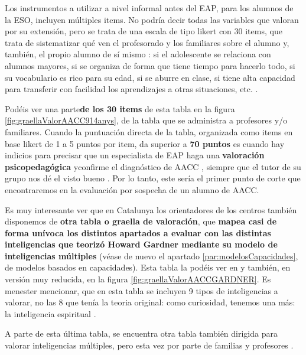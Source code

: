\documentclass[12pt, a4paper]{article}
\begin{document}
	  Los instrumentos a utilizar a nivel informal antes del EAP, para los alumnos de la ESO, incluyen múltiples items. No podría decir todas las variables que valoran por su extensión, pero se trata de una escala de tipo likert con 30 items, que trata de sistematizar qué ven el profesorado y los familiares sobre el alumno y, también, el propio alumno de sí mismo \parencite[21]{gencatAltesCapacitats2013}: si el adolescente se relaciona con alumnos mayores, si se organiza de forma que tiene tiempo para hacerlo todo, si su vocabulario es rico para su edad, si se aburre en clase, si tiene alta capacidad para transferir con facilidad los aprendizajes a otras situaciones, etc. \parencite[19]{gencatAltesCapacitats2013}. 
	  
	  
	  Podéis ver una parte\textbf{de los 30 items} de esta tabla en la figura \ref{fig:graellaValorAACC914anys}, de la tabla que se administra a profesores y/o familiares. Cuando la puntuación directa de la tabla, organizada como items en base likert de 1 a 5 puntos por item, da superior a \textbf{70 puntos} es cuando hay indicios para precisar que un especialista de EAP haga una \textbf{valoración psicopedagógica} yconfirme el diagnóstico de AACC \parencite[29]{gencatAltesCapacitats2013}, siempre que el tutor de su grupo nos dé el visto bueno \parencite[p.37, punto 1]{gencatAltesCapacitats2013}.  Por lo tanto, este sería el primer punto de corte que encontraremos en la evaluación por sospecha de un alumno de AACC.
	  
	  Es muy interesante ver que en Catalunya los orientadores de los centros también disponemos de\textbf{ otra tabla o graella de valoración}, que \textbf{mapea casi de forma unívoca los distintos apartados a evaluar con las distintas inteligencias que teorizó Howard Gardner mediante su modelo de inteligencias múltiples}  (véase de nuevo el apartado  \ref{par:modelosCapacidades}, de modelos basados en capacidades). Esta tabla la podéis ver en \parencite[22--24]{gencatAltesCapacitats2013} y también, en versión muy reducida, en la figura \ref{fig:graellaValorAACCGARDNER}. Es menester mencionar, que en esta tabla se incluyen 9 tipos de inteligencias a valorar, no las 8 que tenía la teoria original: como curiosidad, tenemos una más: la inteligencia espiritual \parencite[24]{gencatAltesCapacitats2013}.
	  
	   A parte de esta última tabla, se encuentra otra tabla también dirigida para valorar inteligencias múltiples, pero esta vez por parte de familias y profesores \textcite[26-28]{gencatAltesCapacitats2013}.
	
\end{document}
